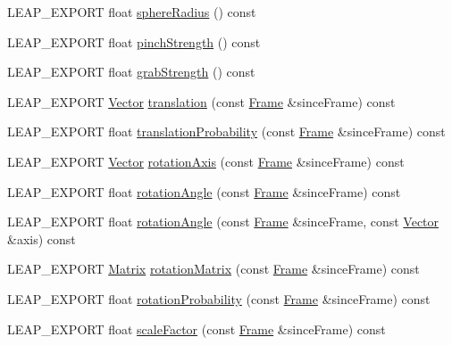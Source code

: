 \begin{DoxyCompactItemize}
L\+E\+A\+P\+\_\+\+E\+X\+P\+O\+RT float \hyperlink{class_leap_1_1_hand_a3ff1cd29c23c1aa2c6482932b9a8fb1e}{sphere\+Radius} () const
\item 
L\+E\+A\+P\+\_\+\+E\+X\+P\+O\+RT float \hyperlink{class_leap_1_1_hand_a736348fe9174978d23b27297da5de072}{pinch\+Strength} () const
\item 
L\+E\+A\+P\+\_\+\+E\+X\+P\+O\+RT float \hyperlink{class_leap_1_1_hand_a8a23340aebe604b2100bd864e8091058}{grab\+Strength} () const
\item 
L\+E\+A\+P\+\_\+\+E\+X\+P\+O\+RT \hyperlink{struct_leap_1_1_vector}{Vector} \hyperlink{class_leap_1_1_hand_ad0ba1e3c607cb893619b668cc7750b89}{translation} (const \hyperlink{class_leap_1_1_frame}{Frame} \&since\+Frame) const
\item 
L\+E\+A\+P\+\_\+\+E\+X\+P\+O\+RT float \hyperlink{class_leap_1_1_hand_a11543de2538fba2e3f15aa422dd5b892}{translation\+Probability} (const \hyperlink{class_leap_1_1_frame}{Frame} \&since\+Frame) const
\item 
L\+E\+A\+P\+\_\+\+E\+X\+P\+O\+RT \hyperlink{struct_leap_1_1_vector}{Vector} \hyperlink{class_leap_1_1_hand_ad76ae361b3b7861ce79fba94f3cca44b}{rotation\+Axis} (const \hyperlink{class_leap_1_1_frame}{Frame} \&since\+Frame) const
\item 
L\+E\+A\+P\+\_\+\+E\+X\+P\+O\+RT float \hyperlink{class_leap_1_1_hand_ad7dd8985dde02d07daf7c81a050e6e24}{rotation\+Angle} (const \hyperlink{class_leap_1_1_frame}{Frame} \&since\+Frame) const
\item 
L\+E\+A\+P\+\_\+\+E\+X\+P\+O\+RT float \hyperlink{class_leap_1_1_hand_aedf018db2f7ead885e78c9d88bc9d3e3}{rotation\+Angle} (const \hyperlink{class_leap_1_1_frame}{Frame} \&since\+Frame, const \hyperlink{struct_leap_1_1_vector}{Vector} \&axis) const
\item 
L\+E\+A\+P\+\_\+\+E\+X\+P\+O\+RT \hyperlink{struct_leap_1_1_matrix}{Matrix} \hyperlink{class_leap_1_1_hand_a247046c6a2557e8d7ac28ea68ff925ef}{rotation\+Matrix} (const \hyperlink{class_leap_1_1_frame}{Frame} \&since\+Frame) const
\item 
L\+E\+A\+P\+\_\+\+E\+X\+P\+O\+RT float \hyperlink{class_leap_1_1_hand_a32ed1424fa35250b69299d9e8cb7d030}{rotation\+Probability} (const \hyperlink{class_leap_1_1_frame}{Frame} \&since\+Frame) const
\item 
L\+E\+A\+P\+\_\+\+E\+X\+P\+O\+RT float \hyperlink{class_leap_1_1_hand_a2c1afe066bbc1b33433c84d6302447cb}{scale\+Factor} (const \hyperlink{class_leap_1_1_frame}{Frame} \&since\+Frame) const
\item 

\end{DoxyCompactItemize}
